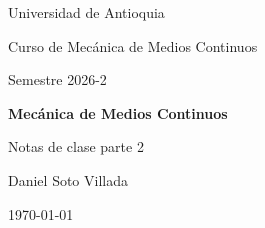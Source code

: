 \documentclass[12pt,letterpaper,oneside]{report}
\begin{document}
\begin{titlepage}
    \centering
    {\Large Universidad de Antioquia\par}
    \vspace{1cm}
    {\large Curso de Mecánica de Medios Continuos\par}
    {\large Semestre 2026-2\par}

    \vfill

    {\Huge\bfseries Mecánica de Medios Continuos\par}
    \vspace{1.5cm}
    {\Large Notas de clase parte 2\par}

    \vfill

    {\large Daniel Soto Villada\par}
    \vspace{1cm}
    {\large \today\par}
\end{titlepage}

\begingroup
\setlength{\parskip}{0pt}
\tableofcontents
\endgroup




\end{document}
